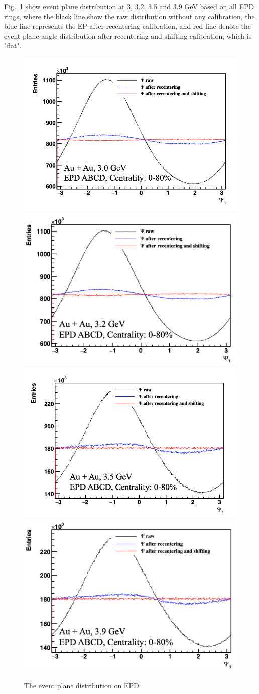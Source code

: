 Fig.~\ref{fig:EP_distribution} show event plane distribution at 3, 3.2, 3.5 and 3.9 GeV based on all EPD rings,
where the black line show the raw distribution without any calibration, the blue line represents the EP after recentering calibration, 
and red line denote the event plane angle distribution after recentering and shifting calibration, which is "flat".
\begin{figure}[hbt!]
\centering
\includegraphics[width=0.45\linewidth]{figures/chapter02/EP_3GeV.png}
\includegraphics[width=0.45\linewidth]{figures/chapter02/EP_3p2GeV.png}
\includegraphics[width=0.45\linewidth]{figures/chapter02/EP_3p5GeV.png}
\includegraphics[width=0.45\linewidth]{figures/chapter02/EP_3p9GeV.png}
\caption{The event plane distribution on EPD.}
\label{fig:EP_distribution}
\end{figure}

